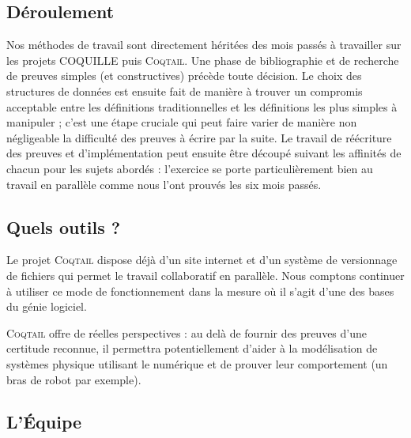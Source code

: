 \documentclass[11pt]{article}
\newcommand{\coqtail}{\textsc{Coqtail}}
\newcommand{\coquille}{\textsc{Coquille}}
\begin{document}
\subsection{Déroulement}

Nos méthodes de travail sont directement héritées des mois passés à travailler sur les projets COQUILLE puis \coqtail{}. Une phase de bibliographie et de recherche de preuves simples (et constructives) précède toute décision. Le choix des structures de données est ensuite fait de manière à trouver un compromis acceptable entre les définitions traditionnelles et les définitions les plus simples à manipuler ; c'est une étape cruciale qui peut faire varier de manière non négligeable la difficulté des preuves à écrire par la suite. Le travail de réécriture des preuves et d'implémentation peut ensuite être découpé suivant les affinités de chacun pour les sujets abordés : l'exercice se porte particulièrement bien au travail en parallèle comme nous l'ont prouvés les six mois passés.

\subsection{Quels outils ?}

Le projet \coqtail{} dispose déjà d'un site internet\cite{coqtail} et d'un système de versionnage de fichiers qui permet le travail collaboratif en parallèle. Nous comptons continuer à utiliser ce mode de fonctionnement dans la mesure où il s'agit d'une des bases du génie logiciel.




\coqtail{} offre de réelles perspectives : au delà de fournir des preuves d'une certitude reconnue, %
il permettra potentiellement d'aider à la modélisation de systèmes physique utilisant le numérique et de prouver leur comportement (un bras de robot par exemple). %

\subsection{L'Équipe}
\end{document}
